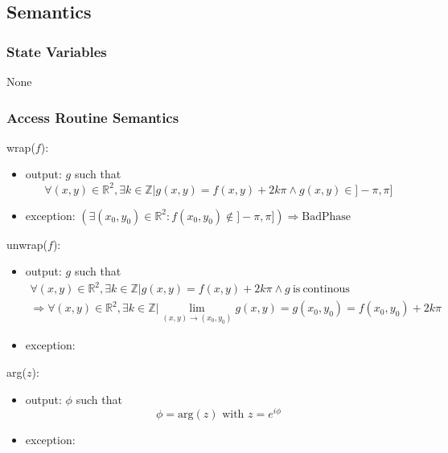 \documentclass[12pt, titlepage]{article}
\begin{document}
\subsection{Semantics}

\subsubsection{State Variables}
None

\subsubsection{Access Routine Semantics}

\noindent wrap($f$):
\begin{itemize} 
\item output: $g$ such that
\begin{equation*}
\forall (x,y) \in \mathbb{R}^2, \exists k \in \mathbb{Z} | g(x,y) =f(x,y)+ 2k\pi 
\wedge g(x,y) \in ]-\pi,\pi]
\end{equation*} 
\item exception:\newline
$(\exists (x_0,y_0) \in \mathbb{R}^2 : f(x_0,y_0) \notin ]-\pi,\pi])\Rightarrow 
\text{BadPhase}$
\end{itemize}

\noindent unwrap($f$):
\begin{itemize} 
\item output: $g$ such that
\begin{equation*}
\begin{gathered}
\forall (x,y) \in \mathbb{R}^2, \exists k \in \mathbb{Z} | g(x,y) =f(x,y) + 
2k\pi \wedge g \ \text{is} \  \text{continous}\\
\Rightarrow \forall (x,y) \in \mathbb{R}^2, \exists k \in \mathbb{Z} | 
\lim_{(x,y)\to (x_0,y_0)} g(x,y) = g(x_0,y_0) = f(x_0,y_0) + 2k\pi
\end{gathered}
\end{equation*}
\item exception:
\end{itemize}

\noindent arg($z$):
\begin{itemize} 
\item output: $\phi$ such that
\begin{equation*}
\phi=\text{arg}(z) \text{ with } z=e^{i\phi}
\end{equation*}
\item exception:
\end{itemize}
\end{document}
